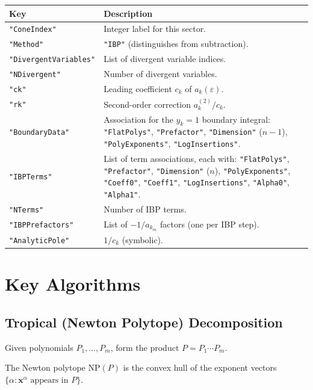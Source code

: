 \documentclass[11pt,a4paper]{article}
\begin{document}
\begin{center}
\begin{tabular}{lp{9cm}}
\toprule
\textbf{Key} & \textbf{Description} \\
\midrule
\texttt{"ConeIndex"} & Integer label for this sector. \\
\texttt{"Method"} & \texttt{"IBP"} (distinguishes from subtraction). \\
\texttt{"DivergentVariables"} & List of divergent variable indices. \\
\texttt{"NDivergent"} & Number of divergent variables. \\
\texttt{"ck"} & Leading coefficient $c_k$ of $a_k(\varepsilon)$. \\
\texttt{"rk"} & Second-order correction $a_k^{(2)}/c_k$. \\
\texttt{"BoundaryData"} & Association for the $y_k=1$ boundary integral: \texttt{"FlatPolys"}, \texttt{"Prefactor"}, \texttt{"Dimension"} ($n{-}1$), \texttt{"PolyExponents"}, \texttt{"LogInsertions"}. \\
\texttt{"IBPTerms"} & List of term associations, each with: \texttt{"FlatPolys"}, \texttt{"Prefactor"}, \texttt{"Dimension"} ($n$), \texttt{"PolyExponents"}, \texttt{"Coeff0"}, \texttt{"Coeff1"}, \texttt{"LogInsertions"}, \texttt{"Alpha0"}, \texttt{"Alpha1"}. \\
\texttt{"NTerms"} & Number of IBP terms. \\
\texttt{"IBPPrefactors"} & List of $-1/a_{k_m}$ factors (one per IBP step). \\
\texttt{"AnalyticPole"} & $1/c_k$ (symbolic). \\
\bottomrule
\end{tabular}
\end{center}

\section{Key Algorithms}

\subsection{Tropical (Newton Polytope) Decomposition}

Given polynomials $P_1, \ldots, P_m$, form the product $P = P_1 \cdots P_m$.

The Newton polytope $\mathrm{NP}(P)$ is the convex hull of the exponent vectors $\{\alpha : \mathbf{x}^\alpha \text{ appears in } P\}$.
\end{document}
